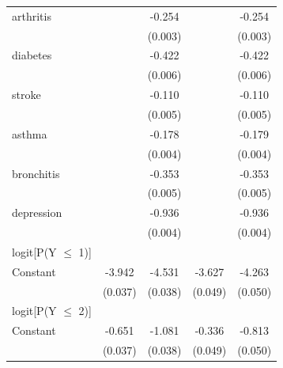 \documentclass[11pt,a4paper,oldfontcommands]{memoir}
\begin{document}
{\begin{footnotesize}
\begin{footnotesize}
\begin{longtable}{l*{4}{c}}
arthritis           &                     &      -0.254\sym{***}&                     &      -0.254\sym{***}\\
                    &                     &     (0.003)         &                     &     (0.003)         \\
 
diabetes            &                     &      -0.422\sym{***}&                     &      -0.422\sym{***}\\
                    &                     &     (0.006)         &                     &     (0.006)         \\
 
stroke              &                     &      -0.110\sym{***}&                     &      -0.110\sym{***}\\
                    &                     &     (0.005)         &                     &     (0.005)         \\
 
asthma              &                     &      -0.178\sym{***}&                     &      -0.179\sym{***}\\
                    &                     &     (0.004)         &                     &     (0.004)         \\
 
bronchitis          &                     &      -0.353\sym{***}&                     &      -0.353\sym{***}\\
                    &                     &     (0.005)         &                     &     (0.005)         \\
 
depression          &                     &      -0.936\sym{***}&                     &      -0.936\sym{***}\\
                    &                     &     (0.004)         &                     &     (0.004)         \\
\hline
logit[P(Y $\leq$ 1)]                &                     &                     &                     &                     \\
Constant            &      -3.942\sym{***}&      -4.531\sym{***}&      -3.627\sym{***}&      -4.263\sym{***}\\
                    &     (0.037)         &     (0.038)         &     (0.049)         &     (0.050)         \\
\hline
logit[P(Y $\leq$ 2)]                &                     &                     &                     &                     \\
Constant            &      -0.651\sym{***}&      -1.081\sym{***}&      -0.336\sym{***}&      -0.813\sym{***}\\
                    &     (0.037)         &     (0.038)         &     (0.049)         &     (0.050)         \\


\end{longtable}
\end{footnotesize}
\end{footnotesize}}
\end{document}
